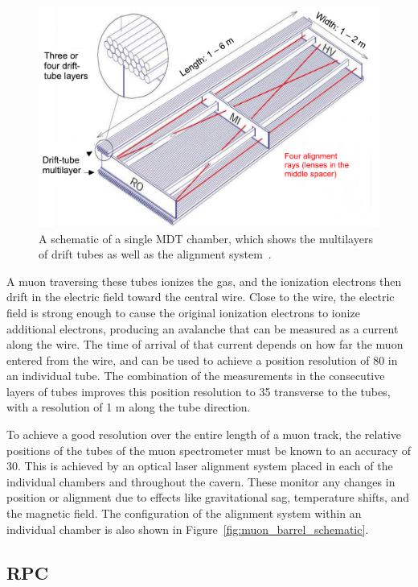 \begin{figure}[hbtp]
\includegraphics[width=\fullfig]{figures/mdt_schematic.pdf}
\caption{A schematic of a single \acs*{MDT} chamber, which shows the multilayers of drift tubes as well as the alignment system~\cite{atlas_experiment}.}
\label{fig:mdt_schematic}
\end{figure}

A muon traversing these tubes ionizes the gas, and the ionization electrons then drift in the electric field toward the central wire.
Close to the wire, the electric field is strong enough to cause the original ionization electrons to ionize additional electrons, producing an avalanche that can be measured as a current along the wire. 
The time of arrival of that current depends on how far the muon entered from the wire, and can be used to achieve a position resolution of 80 \um in an individual tube.
The combination of the measurements in the consecutive layers of tubes improves this position resolution to 35 \um transverse to the tubes, with a resolution of 1 m along the tube direction.

To achieve a good resolution over the entire length of a muon track, the relative positions of the tubes of the muon spectrometer must be known to an accuracy of 30\um. 
This is achieved by an optical laser alignment system placed in each of the individual chambers and throughout the cavern.
These monitor any changes in position or alignment due to effects like gravitational sag, temperature shifts, and the magnetic field.
The configuration of the alignment system within an individual chamber is also shown in Figure~\ref{fig:muon_barrel_schematic}.

\subsection{\acl{RPC}}

